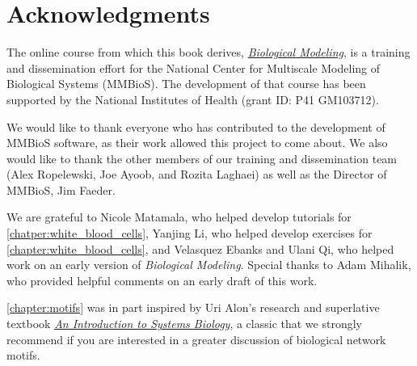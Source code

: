 {\begin{tabular}[]{l @{\hskip 0.05\textwidth} l}
\end{tabular}
}

\newpage


 
\clearpage
{}
\chapter{Acknowledgments}
\label{chapter:acknowledgments}

The online course from which this book derives, \href{https://biologicalmodeling.org}{\textit{Biological Modeling}}, is a training and dissemination effort for the National Center for Multiscale Modeling of Biological Systems (MMBioS). The development of that course has been supported by the National Institutes of Health (grant ID: P41 GM103712).

We would like to thank everyone who has contributed to the development of MMBioS software, as their work allowed this project to come about. We also would like to thank the other members of our training and dissemination team (Alex Ropelewski, Joe Ayoob, and Rozita Laghaei) as well as the Director of MMBioS, Jim Faeder.

We are grateful to Nicole Matamala, who helped develop tutorials for \autoref{chatper:white_blood_cells}, Yanjing Li, who helped develop exercises for \autoref{chapter:white_blood_cells}, and Velasquez Ebanks and Ulani Qi, who helped work on an early version of \textit{Biological Modeling}. Special thanks to Adam Mihalik, who provided helpful comments on an early draft of this work.

\autoref{chapter:motifs} was in part inspired by Uri Alon’s research and superlative textbook \href{https://www.weizmann.ac.il/mcb/UriAlon/introduction-systems-biology-design-principles-biological-circuits}{\textit{An Introduction to Systems Biology}}, a classic that we strongly recommend if you are interested in a greater discussion of biological network motifs.

